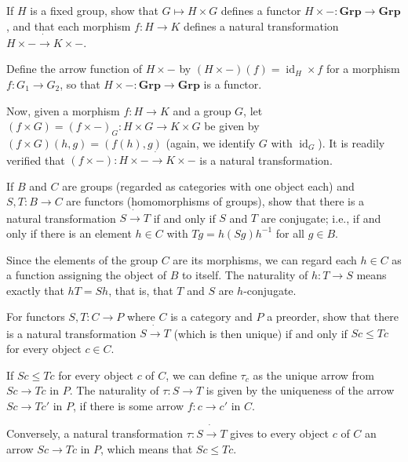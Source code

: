 \begin{exercise}
If $H$ is a fixed group, show that $G\mapsto H\times G$ defines a functor $H\times -:\mathbf{Grp}\to\mathbf{Grp}$, and that each morphism $f:H\to K$ defines a natural transformation $H\times -\dot{\to}K\times -$.
\end{exercise}
\begin{solution}
Define the arrow function of $H\times -$ by $(H\times -)(f)=\operatorname{id}_H\times f$ for a morphism $f:G_1\to G_2$, so that $H\times -:\mathbf{Grp}\to\mathbf{Grp}$ is a functor.

Now, given a morphism $f:H\to K$ and a group $G$, let $(f\times G)=(f\times -)_G:H\times G\to K\times G$ be given by $(f\times G)(h,g)=(f(h),g)$ (again, we identify $G$ with $\operatorname{id}_G$). It is readily verified that $(f\times -):H\times -\dot{\to}K\times -$ is a natural transformation.
\end{solution}

\begin{exercise}
If $B$ and $C$ are groups (regarded as categories with one object each) and $S,T:B\to C$ are functors (homomorphisms of groups), show that there is a natural transformation $S\dot{\to} T$ if and only if $S$ and $T$ are conjugate; i.e., if and only if there is an element $h\in C$ with $Tg=h(Sg)h^{-1}$ for all $g\in B$.
\end{exercise}
\begin{solution}
Since the elements of the group $C$ are its morphisms, we can regard each $h\in C$ as a function assigning the object of $B$ to itself. The naturality of $h:T\to S$ means exactly that $hT=Sh$, that is, that $T$ and $S$ are $h$-conjugate.
\end{solution}

\begin{exercise}
For functors $S,T:C\to P$ where $C$ is a category and $P$ a preorder, show that there is a natural transformation $S\dot{\to}T$ (which is then unique) if and only if $Sc\leq Tc$ for every object $c\in C$.
\end{exercise}
\begin{solution}
If $Sc\leq Tc$ for every object $c$ of $C$, we can define $\tau_c$ as the unique arrow from $Sc\to Tc$ in $P$. The naturality of $\tau:S\to T$ is given by the uniqueness of the arrow $Sc\to Tc'$ in $P$, if there is some arrow $f:c\to c'$ in $C$.

Conversely, a natural transformation $\tau:S\dot{\to}T$ gives to every object $c$ of $C$ an arrow $Sc\to Tc$ in $P$, which means that $Sc\leq Tc$.
\end{solution}

